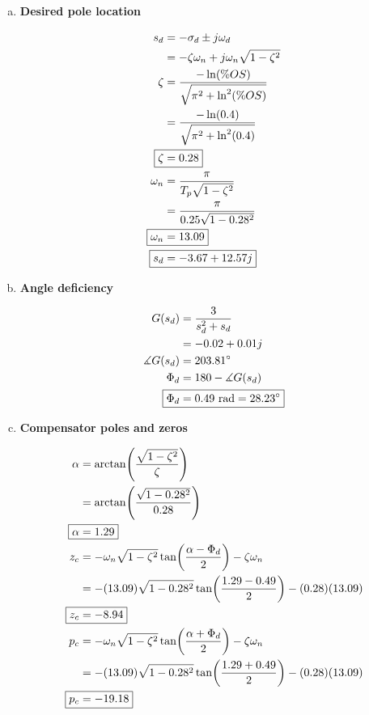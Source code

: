 \documentclass[12pt,a4paper]{article}
\begin{document}
\begin{enumerate}[(a)]

\item \textbf{Desired pole location}

\begin{align}
	s_d &= -\sigma_d \pm j\omega_d \\
	&= -\zeta\omega_n + j\omega_n \sqrt{1-\zeta^2} \\
	\zeta &= \frac{-\ln(\%OS)}{\sqrt{\pi^2 + \ln^2(\%OS)}} \\
	&= \frac{-\ln(0.4)}{\sqrt{\pi^2 + \ln^2(0.4)}} \\
	\Aboxed{
		\zeta &= 0.28
	} \label{eq:zeta} \\
	\omega_n &= \frac{\pi}{T_p \sqrt{1-\zeta^2}} \\
	&= \frac{\pi}{0.25\sqrt{1-0.28^2}} \\
	\Aboxed{
		\omega_n &= 13.09
	} \label{eq:natural-freq} \\
	\Aboxed{
		s_d &= -3.67 + 12.57j
	} \label{eq:desired-pole}
\end{align}

\item \textbf{Angle deficiency}

\begin{align}
	G(s_d) &= \frac{3}{s_d^2 + s_d} \\
	&= -0.02 + 0.01j \\
	\measuredangle G(s_d) &= 203.81^\circ \\
	\Phi_d &= 180 - \measuredangle G(s_d) \\
	\Aboxed{
		\Phi_d &= 0.49 \textrm{ rad} = 28.23^\circ
	} \label{eq:angle-def}
\end{align}

\item \textbf{Compensator poles and zeros}

\begin{align}
	\alpha &= \arctan(\frac{\sqrt{1-\zeta^2}}{\zeta}) \\
	&= \arctan(\frac{\sqrt{1-0.28^2}}{0.28}) \\
	\Aboxed{
		\alpha &= 1.29
	} \label{eq:alpha} \\
	z_c &= -\omega_n \sqrt{1-\zeta^2} \tan(\frac{\alpha - \Phi_d}{2}) - \zeta\omega_n \\
	&= -(13.09)\sqrt{1-0.28^2}\tan(\frac{1.29 - 0.49}{2}) - (0.28)(13.09) \\
	\Aboxed{
		z_c &= -8.94
	} \label{eq:compensator-zero} \\
	p_c &= -\omega_n \sqrt{1-\zeta^2} \tan(\frac{\alpha + \Phi_d}{2}) - \zeta\omega_n \\
	&= -(13.09)\sqrt{1-0.28^2}\tan(\frac{1.29 + 0.49}{2}) - (0.28)(13.09) \\
	\Aboxed{
		p_c &= -19.18
	} \label{eq:compensator-pole}
\end{align}


\end{enumerate}
\end{document}

